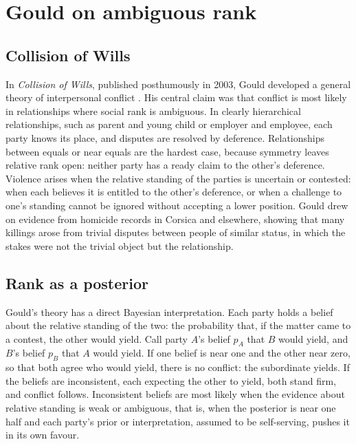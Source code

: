 \section{Gould on ambiguous rank}

\subsection{Collision of Wills}

In \emph{Collision of Wills}, published posthumously in 2003, Gould developed a general theory of interpersonal conflict \citep{gould2003}. His central claim was that conflict is most likely in relationships where social rank is ambiguous. In clearly hierarchical relationships, such as parent and young child or employer and employee, each party knows its place, and disputes are resolved by deference. Relationships between equals or near equals are the hardest case, because symmetry leaves relative rank open: neither party has a ready claim to the other's deference. Violence arises when the relative standing of the parties is uncertain or contested: when each believes it is entitled to the other's deference, or when a challenge to one's standing cannot be ignored without accepting a lower position. Gould drew on evidence from homicide records in Corsica and elsewhere, showing that many killings arose from trivial disputes between people of similar status, in which the stakes were not the trivial object but the relationship.

\subsection{Rank as a posterior}

Gould's theory has a direct Bayesian interpretation. Each party holds a belief about the relative standing of the two: the probability that, if the matter came to a contest, the other would yield. Call party $A$'s belief $p_A$ that $B$ would yield, and $B$'s belief $p_B$ that $A$ would yield. If one belief is near one and the other near zero, so that both agree who would yield, there is no conflict: the subordinate yields. If the beliefs are inconsistent, each expecting the other to yield, both stand firm, and conflict follows. Inconsistent beliefs are most likely when the evidence about relative standing is weak or ambiguous, that is, when the posterior is near one half and each party's prior or interpretation, assumed to be self-serving, pushes it in its own favour.

